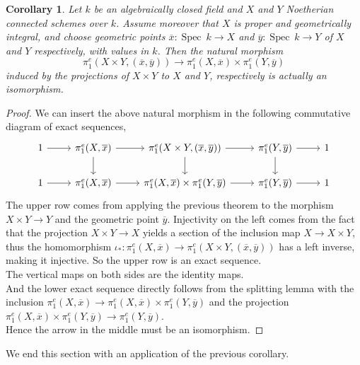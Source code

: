 \documentclass{article}
\theoremstyle{plain}
\newtheorem{corollary}[theorem]{Corollary}
\theoremstyle{definition}
\DeclareMathOperator{\Spec}{Spec}
\begin{document}
\begin{corollary}
    Let $k$ be an algebraically closed field and $X$ and $Y$ Noetherian connected schemes over $k$.
    Assume moreover that $X$ is proper and geometrically integral, and choose geometric points $\overline{x}:\Spec \: k \rightarrow X$ and $\overline{y}:\Spec\:k\rightarrow Y$ of $X$ and $Y$ respectively, with values in $k$.
    Then the natural morphism
    $$\pi^e_1(X\times Y, (\overline{x},\overline{y})) \rightarrow \pi^e_1(X,\overline{x}) \times \pi^e_1(Y,\overline{y})$$
    induced by the projections of $X\times Y$ to $X$ and $Y$, respectively is actually an isomorphism.
\end{corollary}
\begin{proof}
    We can insert the above natural morphism in the following commutative diagram of exact sequences,
    \[
    \begin{tikzcd}
    1\arrow[r] & \pi^e_1(X,\overline{x})\arrow[r]\arrow[d] & \pi^e_1(X\times Y, (\overline{x},\overline{y}))\arrow[r]\arrow[d] & \pi^e_1(Y,\overline{y})\arrow[r]\arrow[d] & 1\\
    1\arrow[r] & \pi^e_1(X,\overline{x})\arrow[r] & \pi^e_1(X ,\overline{x})\times \pi^e_1(Y,\overline{y})\arrow[r] & \pi^e_1(Y,\overline{y})\arrow[r] & 1 
    \end{tikzcd}
    \]
    The upper row comes from applying the previous theorem to the morphism $X\times Y\rightarrow Y$ and the geometric point $\overline{y}$.
    Injectivity on the left comes from the fact that the projection $X\times Y\rightarrow X$ yields a section of the inclusion map $X\rightarrow X\times Y$, thus the homomorphism $\iota_*: \pi^e_1(X,\overline{x}) \rightarrow \pi^e_1(X\times Y,(\overline{x},\overline{y}))$ has a left inverse, making it injective.
    So the upper row is an exact sequence.\\
    The vertical maps on both sides are the identity maps.\\
    And the lower exact sequence directly follows from the splitting lemma with the inclusion $ \pi^e_1(X,\overline{x})\rightarrow \pi^e_1(X,\overline{x}) \times \pi^e_1(Y,\overline{y})$ and the projection $\pi^e_1(X,\overline{x}) \times \pi^e_1(Y,\overline{y}) \rightarrow \pi^e_1(Y,\overline{y})$.\\
    Hence the arrow in the middle must be an isomorphism.
\end{proof}


\noindent We end this section with an application of the previous corollary.
\end{document}
